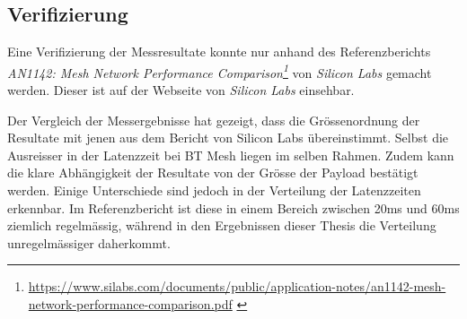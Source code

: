 \subsection{Verifizierung}\label{subsec:Verifizierung}
Eine Verifizierung der Messresultate konnte nur anhand des Referenzberichts \textit{AN1142: Mesh Network Performance
Comparison\footnote{\url{https://www.silabs.com/documents/public/application-notes/an1142-mesh-network-performance-comparison.pdf} \cite{silicon_laboratories_inc_an1142_2020}}} von \textit{Silicon Labs} gemacht werden.
Dieser ist auf der Webseite von \textit{Silicon Labs} einsehbar.

Der Vergleich der Messergebnisse hat gezeigt, dass die Grössenordnung der Resultate mit jenen aus dem Bericht von Silicon Labs übereinstimmt.
Selbst die Ausreisser in der Latenzzeit bei BT Mesh liegen im selben Rahmen.
Zudem kann die klare Abhängigkeit der Resultate von der Grösse der Payload bestätigt werden.
Einige Unterschiede sind jedoch in der Verteilung der Latenzzeiten erkennbar.
Im Referenzbericht ist diese in einem Bereich zwischen 20ms und 60ms ziemlich regelmässig, während in den Ergebnissen dieser Thesis die Verteilung unregelmässiger daherkommt.






